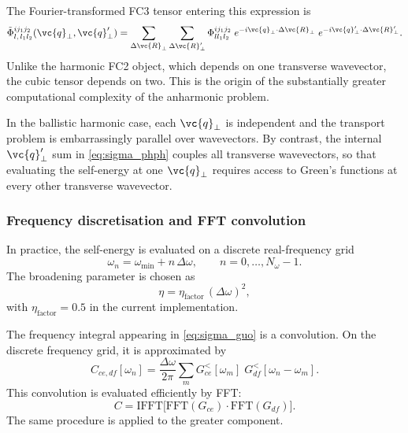 The Fourier-transformed FC3 tensor entering this expression is
\begin{equation}\label{eq:fc3_fourier}
  \tilde{\Phi}^{ij_1j_2}_{l,\,l_1 l_2}
  (\vc{q}_\perp,\vc{q}'_\perp)
  = \sum_{\Delta\vc{R}_\perp}\sum_{\Delta\vc{R}'_\perp}
    \Phi^{ij_1j_2}_{l l_1 l_2}\;
    e^{-i\vc{q}_\perp\cdot\Delta\vc{R}_\perp}\;
    e^{-i\vc{q}'_\perp\cdot\Delta\vc{R}'_\perp}.
\end{equation}
Unlike the harmonic FC2 object, which depends on one transverse
wavevector, the cubic tensor depends on two.  This is the origin of the
substantially greater computational complexity of the anharmonic
problem.

In the ballistic harmonic case, each $\vc{q}_\perp$ is independent and
the transport problem is embarrassingly parallel over wavevectors.  By
contrast, the internal $\vc{q}'_\perp$ sum in
\cref{eq:sigma_phph} couples all transverse wavevectors, so that
evaluating the self-energy at one $\vc{q}_\perp$ requires access to
Green's functions at every other transverse wavevector.

\subsubsection{Frequency discretisation and FFT convolution}
\label{sec:fft}

In practice, the self-energy is evaluated on a discrete real-frequency
grid
\begin{equation}
  \omega_n = \omega_\mathrm{min} + n\,\Delta\omega,
  \qquad
  n = 0,\ldots,N_\omega-1.
\end{equation}
The broadening parameter is chosen as
\begin{equation}
  \eta = \eta_\mathrm{factor}\,(\Delta\omega)^2,
\end{equation}
with $\eta_\mathrm{factor}=0.5$ in the current implementation.

The frequency integral appearing in \cref{eq:sigma_guo} is a
convolution.  On the discrete frequency grid, it is approximated by
\begin{equation}
  C_{ce,df}[\omega_n]
  = \frac{\Delta\omega}{2\pi}
    \sum_m
    G^<_{ce}[\omega_m]\;
    G^<_{df}[\omega_n-\omega_m].
\end{equation}
This convolution is evaluated efficiently by FFT:
\begin{equation}
  C
  = \mathrm{IFFT}\!\bigl[
      \mathrm{FFT}(G_{ce})\cdot \mathrm{FFT}(G_{df})
    \bigr].
\end{equation}
The same procedure is applied to the greater component.

